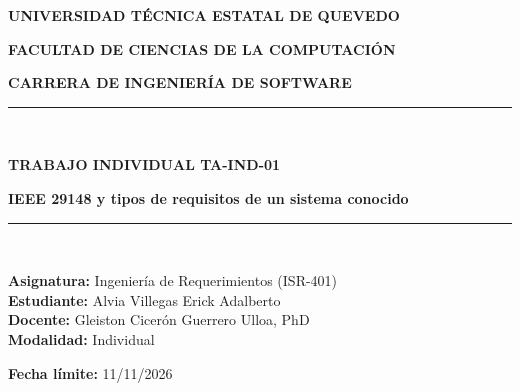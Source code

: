 \documentclass[12pt,a4paper]{article}
\begin{document}

\begin{titlepage}
\centering

{\bfseries\Large
UNIVERSIDAD TÉCNICA ESTATAL DE QUEVEDO\par}

\vspace{0.2cm}

{\bfseries\large
FACULTAD DE CIENCIAS DE LA COMPUTACIÓN\par}

{\bfseries\large
CARRERA DE INGENIERÍA DE SOFTWARE\par}

\vspace{0.4cm}

\rule{\linewidth}{0.5mm}\\[0.3cm]

{\huge\bfseries
TRABAJO INDIVIDUAL TA-IND-01\par}

\vspace{0.2cm}

{\large\bfseries
IEEE 29148 y tipos de requisitos de un sistema conocido\par}

\rule{\linewidth}{0.5mm}\\[0.6cm]

\begin{minipage}{0.48\textwidth}
    \begin{flushleft}
    \large

    \textbf{Asignatura:}
    Ingeniería de Requerimientos (ISR-401)\\

    \textbf{Estudiante:}
    Alvia Villegas Erick Adalberto\\

    \textbf{Docente:}
    Gleiston Cicerón Guerrero Ulloa, PhD\\

    \textbf{Modalidad:}
    Individual

    \end{flushleft}
\end{minipage}
\begin{minipage}{0.48\textwidth}
    \begin{flushright}
    \large

    \textbf{Fecha límite:}
    11/11/2026\\


\end{flushright}
\end{minipage}
\end{titlepage}
\end{document}
